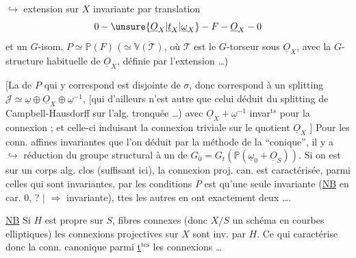 $\hookrightarrow$ extension sur $X$ invariante par translation
\[
0\mathbin{-}\unsure{\underline O_X|\underline t_X|\underline\omega_X}\mathbin{-}F\mathbin{-}\underline O_X\mathbin{-}0
\]
et un $G$-isom. $P\simeq\mathbb P(F)$ ($\simeq\overline{\mathbb V(\mathcal T)}$, où $\mathcal T$ est
le $G$-torseur sous $\underline O_X$, avec la $G$-structure
habituelle de $\underline O_X$, définie par l'extension \ldots)

[La  de $P$ qui y correspond est
 disjointe de $\sigma$, donc correspond à
un splitting  $\mathscr J\simeq\underline\omega\oplus\underline O_X\oplus\underline\omega^{-1}$,
[qui d'ailleurs n'est autre que celui
déduit du splitting de Campbell-Hausdorff
sur l'alg. tronquée \ldots) avec $\underline O_X+\underline\omega^{-1}$  invar$^{\mathrm ts}$
pour la connexion ; et celle-ci induisant
la connexion  triviale sur le
quotient $\underline O_X$ \unsure{\ldots}] Pour les conn. affines
invariantes que l'on déduit par
la méthode de la ``conique'', il
y a $\hookrightarrow$ réduction  du groupe structural 
à un    de $G_0=G_t(\mathbb P(\underline\omega_0+\underline O_S))$.
Si on est sur un corps alg. clos (suffisant ici), 
la connexion proj. can. est caractérisée, parmi
celles qui sont invariantes, par les conditions
 $P$ est  qu'une seule 
 invariante (\uline{NB} en car. $0$, 
? $\mid$ $\Rightarrow$ invariante), ttes les autres en
ont exactement deux \ldots.

\uline{NB} Si $H$ est propre sur $S$, fibres connexes (donc
$X/S$ un schéma en courbes elliptiques)
\uline{} les connexions projectives sur $X$
sont inv. par $H$. Ce qui caractérise donc
la conn.  canonique parmi \uline{t$^{\mathrm{tes}}$}
les connexions \ldots
